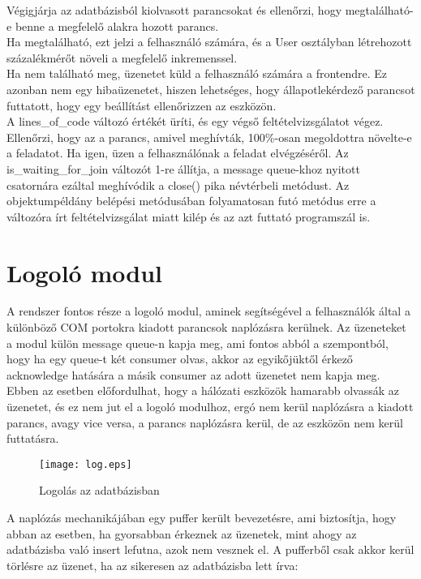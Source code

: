 \documentclass[12pt]{report}
\begin{document}
Végigjárja az adatbázisból kiolvasott parancsokat és ellenőrzi, hogy megtalálható-e benne a megfelelő alakra hozott parancs.\\
Ha megtalálható, ezt jelzi a felhasználó számára, és a User osztályban létrehozott százalékmérőt növeli a megfelelő inkremenssel.\\
Ha nem található meg, üzenetet küld a felhasználó számára a frontendre. Ez azonban nem egy hibaüzenetet, hiszen lehetséges, hogy állapotlekérdező parancsot futtatott, hogy egy beállítást ellenőrizzen az eszközön.\\
A lines\_of\_code változó értékét üríti, és egy végső feltételvizsgálatot végez. Ellenőrzi, hogy az a parancs, amivel meghívták, 100\%-osan megoldottra növelte-e a feladatot. Ha igen, üzen a felhasználónak a feladat elvégzéséről. Az is\_waiting\_for\_join változót 1-re állítja, a message queue-khoz nyitott csatornára ezáltal meghívódik a close() pika névtérbeli metódust. Az objektumpéldány belépési metódusában folyamatosan futó metódus erre a változóra írt feltételvizsgálat miatt kilép és az azt futtató programszál is.


\section{Logoló modul}


A rendszer fontos része a logoló modul, aminek segítségével a felhasználók által a különböző COM portokra kiadott parancsok naplózásra kerülnek. Az üzeneteket a modul külön message queue-n kapja meg, ami fontos abból a szempontból, hogy ha egy queue-t két consumer olvas, akkor az egyikőjüktől érkező acknowledge hatására a másik consumer az adott üzenetet nem kapja meg. Ebben az esetben előfordulhat, hogy a hálózati eszközök hamarabb olvassák az üzenetet, és ez nem jut el a logoló modulhoz, ergó nem kerül naplózásra a kiadott parancs, avagy vice versa, a parancs naplózásra kerül, de az eszközön nem kerül futtatásra.

\begin{figure}[h]
    \centering
    \texttt{[image: log.eps]}
    \caption{Logolás az adatbázisban}
\end{figure}

A naplózás mechanikájában egy puffer került bevezetésre, ami biztosítja, hogy abban az esetben, ha gyorsabban érkeznek az üzenetek, mint ahogy az adatbázisba való insert lefutna, azok nem vesznek el. A pufferből csak akkor kerül törlésre az üzenet, ha az sikeresen az adatbázisba lett írva:
\end{document}
